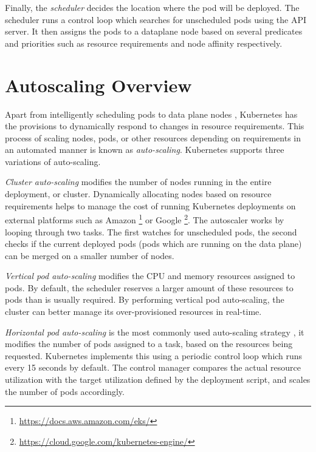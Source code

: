 Finally, the \textit{scheduler} decides the location where the pod will be deployed. The scheduler runs a control loop which searches for unscheduled pods using the API server. It then assigns the pods to a dataplane node based on several predicates and priorities such as resource requirements and node affinity respectively.

\section{Autoscaling Overview}
\label{sec:auto-scaling}

Apart from intelligently scheduling pods to data plane nodes \cite{kayal2020kubernetes}, Kubernetes has the provisions to dynamically respond to changes in resource requirements. This process of scaling nodes, pods, or other resources depending on requirements in an automated manner is known as \textit{auto-scaling}. Kubernetes supports three variations of auto-scaling.\par

\textit{Cluster auto-scaling} modifies the number of nodes running in the entire deployment, or cluster. Dynamically allocating nodes based on resource requirements helps to manage the cost of running Kubernetes deployments on external platforms such as Amazon \footnote{\url{https://docs.aws.amazon.com/eks/}} or Google \footnote{\url{https://cloud.google.com/kubernetes-engine/}}. The autoscaler works by looping through two tasks. The first watches for unscheduled pods, the second checks if the current deployed pods (pods which are running on the data plane) can be merged on a smaller number of nodes.\par

\textit{Vertical pod auto-scaling} modifies the CPU and memory resources assigned to pods. By default, the scheduler reserves a larger amount of these resources to pods than is usually required. By performing vertical pod auto-scaling, the cluster can better manage its over-provisioned resources in real-time.\par

\textit{Horizontal pod auto-scaling} is the most commonly used auto-scaling strategy \cite{baresi2021kosmos}, it modifies the number of pods assigned to a task, based on the resources being requested. Kubernetes implements this using a periodic control loop which runs every 15 seconds by default. The control manager compares the actual resource utilization with the target utilization defined by the deployment script, and scales the number of pods accordingly.

